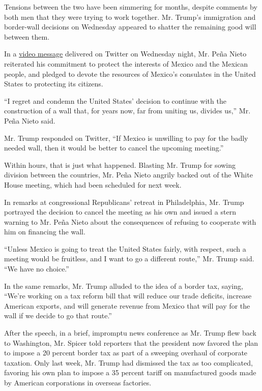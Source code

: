 Tensions between the two have been simmering for months, despite
comments by both men that they were trying to work together. Mr. Trump's
immigration and border-wall decisions on Wednesday appeared to shatter
the remaining good will between them.

In a \href{https://twitter.com/EPN/status/824447050066468865}{video
message} delivered on Twitter on Wednesday night, Mr. Peña Nieto
reiterated his commitment to protect the interests of Mexico and the
Mexican people, and pledged to devote the resources of Mexico's
consulates in the United States to protecting its citizens.

``I regret and condemn the United States' decision to continue with the
construction of a wall that, for years now, far from uniting us, divides
us,'' Mr. Peña Nieto said.

Mr. Trump responded on Twitter, ``If Mexico is unwilling to pay for the
badly needed wall, then it would be better to cancel the upcoming
meeting.''

Within hours, that is just what happened. Blasting Mr. Trump for sowing
division between the countries, Mr. Peña Nieto angrily backed out of the
White House meeting, which had been scheduled for next week.

In remarks at congressional Republicans' retreat in Philadelphia, Mr.
Trump portrayed the decision to cancel the meeting as his own and issued
a stern warning to Mr. Peña Nieto about the consequences of refusing to
cooperate with him on financing the wall.

``Unless Mexico is going to treat the United States fairly, with
respect, such a meeting would be fruitless, and I want to go a different
route,'' Mr. Trump said. ``We have no choice.''

In the same remarks, Mr. Trump alluded to the idea of a border tax,
saying, ``We're working on a tax reform bill that will reduce our trade
deficits, increase American exports, and will generate revenue from
Mexico that will pay for the wall if we decide to go that route.''

After the speech, in a brief, impromptu news conference as Mr. Trump
flew back to Washington, Mr. Spicer told reporters that the president
now favored the plan to impose a 20 percent border tax as part of a
sweeping overhaul of corporate taxation. Only last week, Mr. Trump had
dismissed the tax as too complicated, favoring his own plan to impose a
35 percent tariff on manufactured goods made by American corporations in
overseas factories.

